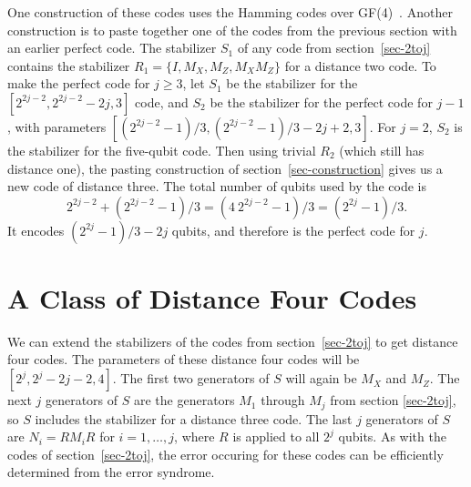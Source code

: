 \documentclass{report}
\begin{document}
One construction of these codes uses the Hamming codes over 
GF(4)~\cite{calderbank-GF4}.  Another construction is to paste together one 
of the codes from the previous section with an earlier perfect code.  The 
stabilizer $S_1$ of any code from section~\ref{sec-2toj} contains the 
stabilizer $R_1 = \{I, M_X, M_Z, M_X M_Z\}$ for a distance two code.  To 
make the perfect code for $j \geq 3$, let $S_1$ be the stabilizer for the 
$[2^{2j - 2}, 2^{2j - 2} - 2j, 3]$ code, and $S_2$ be the stabilizer for the
perfect code for $j-1$, with parameters $[(2^{2j-2}-1)/3, (2^{2j-2}-1)/3 - 2j + 
2, 3]$.  For $j=2$, $S_2$ is the stabilizer for the five-qubit code.  Then 
using trivial $R_2$ (which still has distance one), the pasting construction of 
section~\ref{sec-construction} gives us a new code of distance three.  The 
total number of qubits used by the code is 
\begin{equation}
2^{2j - 2} + (2^{2j-2}-1)/3 = (4\ 2^{2j-2} - 1)/3 = (2^{2j} - 1)/3.
\end{equation}
It encodes $(2^{2j}-1)/3 - 2j$ qubits, and therefore is the perfect code for 
$j$.

\section{A Class of Distance Four Codes}

We can extend the stabilizers of the codes from section~\ref{sec-2toj} to 
get distance four codes.  The parameters of these distance four codes will be 
$[2^j, 2^j - 2j - 2, 4]$.  The first two generators of $S$ will again be $M_X$ 
and $M_Z$.  The next $j$ generators of $S$ are the generators $M_1$ through 
$M_j$ from section \ref{sec-2toj}, so $S$ includes the stabilizer for a 
distance three code.  The last $j$ generators of $S$ are $N_i = R M_i R$ for 
$i = 1, \ldots, j$, where $R$ is applied to all $2^j$ qubits.  As with the
codes of section~\ref{sec-2toj}, the error occuring for these codes can
be efficiently determined from the error syndrome.
\end{document}
